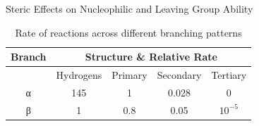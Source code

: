 \documentclass[10pt]{article}
\begin{document}
\begin{core}{Steric Effects on Nucleophilic and Leaving Group Ability}
    \begin{table}[H]
    \centering
    \begin{tabular}{ccccc}
    \hline
    \textbf{Branch} & \multicolumn{4}{c}{\textbf{Structure \& Relative Rate}} \\
    \hline
     & Hydrogens & Primary & Secondary & Tertiary \\
    α & 145 & 1 & 0.028 & 0 \\
    β & 1 & 0.8 & 0.05 & $10^{-5}$ \\
    \hline
    \end{tabular}
    \caption{Rate of \snt reactions across different branching patterns}
    \label{tab:filler9}
    \end{table} 

  \end{core}
\end{document}
